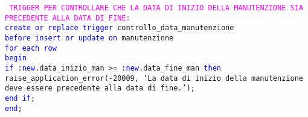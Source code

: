 \documentclass{article}
\begin{document}
    \begin{flushleft}
        \texttt{
        \textcolor{magenta}{TRIGGER PER CONTROLLARE CHE LA DATA DI INIZIO DELLA MANUTENZIONE SIA PRECEDENTE \hspace*{0.5em}ALLA DATA DI FINE:} \\
        \hspace*{2em} \textcolor{blue}{create or replace trigger} controllo\_data\_manutenzione \\
        \hspace*{2em} \textcolor{blue}{before insert or update on} manutenzione \\
        \hspace*{2em} \textcolor{blue}{for each row} \\
        \hspace*{2em} \textcolor{blue}{begin} \\
        \hspace*{4.4em}\textcolor{blue}{if} :\textcolor{blue}{new}.data\_inizio\_man >= :\textcolor{blue}{new}.data\_fine\_man \textcolor{blue}{then} \hspace*{4.4em}raise\_application\_error(-20009, 'La data di inizio della manutenzione \hspace*{4.4em}deve essere precedente alla data di fine.');\\
        \hspace*{4em} \textcolor{blue}{end if}; \\
        \hspace*{2em} \textcolor{blue}{end}; \\}
    \end{flushleft}
\end{document}
